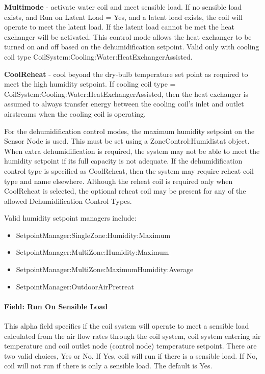 \textbf{Multimode} - activate water coil and meet sensible load. If no sensible load exists, and Run on Latent Load = Yes, and a latent load exists, the coil will operate to meet the latent load. If the latent load cannot be met the heat exchanger will be activated. This control mode allows the heat exchanger to be turned on and off based on the dehumidification setpoint. Valid only with cooling coil type CoilSystem:Cooling:Water:HeatExchangerAssisted.

\textbf{CoolReheat} - cool beyond the dry-bulb temperature set point as required to meet the high humidity setpoint. If cooling coil type = CoilSystem:Cooling:Water:HeatExchangerAssisted, then the heat exchanger is assumed to always transfer energy between the cooling coil’s inlet and outlet airstreams when the cooling coil is operating.


For the dehumidification control modes, the maximum humidity setpoint on the Sensor Node is used. This must be set using a ZoneControl:Humidistat object. When extra dehumidification is required, the system may not be able to meet the humidity setpoint if its full capacity is not adequate. If the dehumidification control type is specified as CoolReheat, then the system may require reheat coil type and name elsewhere. Although the reheat coil is required only when CoolReheat is selected, the optional reheat coil may be present for any of the allowed Dehumidification Control Types.

Valid humidity setpoint managers include:
\begin{itemize}
\item SetpointManager:SingleZone:Humidity:Maximum
\item SetpointManager:MultiZone:Humidity:Maximum
\item SetpointManager:MultiZone:MaximumHumidity:Average
\item SetpointManager:OutdoorAirPretreat
\end{itemize}

\paragraph{Field: Run On Sensible Load}\label{field-run-on-sensible-load-01}

This alpha field specifies if the coil system will operate to meet a sensible load calculated from the air flow rates through the coil system, coil system entering air temperature and coil outlet node (control node) temperature setpoint. There are two valid choices, Yes or No. If Yes, coil will run if there is a sensible load. If No, coil will not run if there is only a sensible load. The default is Yes.


